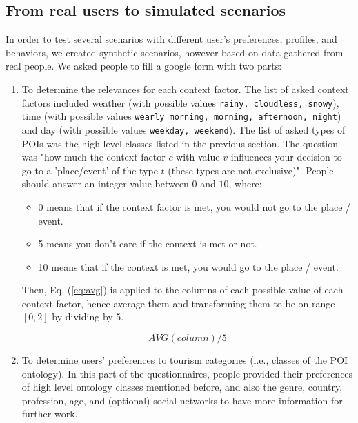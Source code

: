 \subsection{From real users to simulated scenarios}
\label{section:relevances-survey}

In order to test several scenarios with different user's preferences, profiles, and behaviors,  we created synthetic scenarios, however based on data gathered from real people.
We asked people to fill a google form with two parts: 

\begin{enumerate}
    \item To determine the relevances for each context factor. The list of asked context factors included weather (with possible values {\tt rainy, cloudless, snowy}), time (with possible values {\tt wearly morning, morning, afternoon, night}) and day (with possible values {\tt weekday, weekend}). The list of asked types of POIs was the high level classes listed in the previous section. The question was "how much the context factor $c$ with value $v$ influences your decision to go to a 'place/event' of the type $t$ (these types are not exclusive)". People should answer an integer value between $0$ and $10$, where: 
\begin{itemize}
    \item $0$ means that if the context factor is met, you would not go to the place / event.
    \item 5 means you don't care if the context is met or not.
    \item 10 means that if the context is met, you would go to the place / event.
\end{itemize}

Then, Eq. (\ref{eq:avg}) is applied to the columns of each possible value of each context factor, hence average them and transforming them to be on range $[0,2]$ by dividing by $5$.

\begin{equation}
    \label{eq:avg}
    AVG(column)/5
\end{equation}

 \item To determine users' preferences to tourism categories (i.e., classes of the POI ontology). In this part of the questionnaires, people provided their preferences  of high level ontology classes mentioned before, and also the genre, country, profession, age, and (optional) social networks to have more information for further work. 
 
 
\end{enumerate}
    
